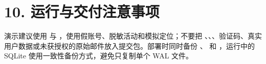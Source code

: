 \documentclass[UTF8,a4paper,12pt]{ctexart}
\begin{document}
\section{10. 运行与交付注意事项}
演示建议使用 \texttt{} 与 \texttt{}，使用假账号、脱敏活动和模拟定位；不要把 \texttt{}、\texttt{}、\texttt{}、验证码、真实用户数据或未获授权的原始邮件放入提交包。部署时同时备份 \texttt{}、\texttt{} 和 \texttt{}，运行中的 SQLite 使用一致性备份方式，避免只复制单个 WAL 文件。\par
\end{document}
